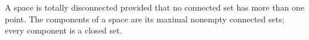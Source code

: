 A space is totally disconnected provided that no connected set has more than one point. The components of a space are its maximal nonempty connected sets; every component is a closed set.
